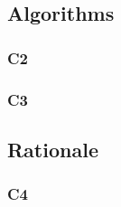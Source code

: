\documentclass[a4wide, 11pt]{article}
\begin{document}
\subsection{Algorithms}
\subsubsection{C2}

\subsubsection{C3}

\subsection{Rationale}
\subsubsection{C4}
\end{document}
